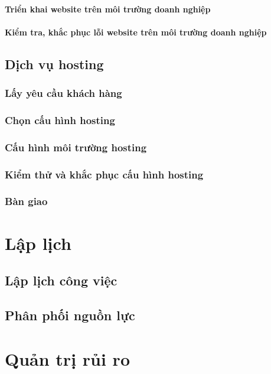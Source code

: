 \documentclass[a4paper]{book}
\begin{document}
\subsubsection{Triển khai website trên môi trường doanh nghiệp}
\subsubsection{Kiểm tra, khắc phục lỗi website trên môi trường doanh nghiệp}
\section{Dịch vụ hosting}
\subsection{Lấy yêu cầu khách hàng}
\subsection{Chọn cấu hình hosting}
\subsection{Cấu hình môi trường hosting}
\subsection{Kiểm thử và khắc phục cấu hình hosting}
\subsection{Bàn giao}
\chapter{Lập lịch}
\section{Lập lịch công việc}
\section{Phân phối nguồn lực}
\chapter{Quản trị rủi ro}
\newpage
\listoffigures
\newpage
 

\end{document}
